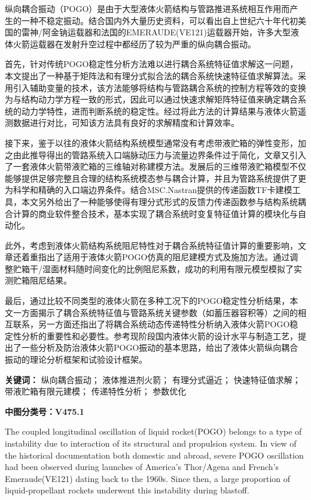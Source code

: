 
纵向耦合振动（POGO）是由于大型液体火箭结构与管路推进系统相互作用而产生的一种不稳定振动。结合国内外大量历史资料，可以看出自上世纪六十年代初美国的雷神/阿金钠运载器和法国的EMERAUDE(VE121)运载器开始，许多大型液体火箭运载器在发射升空过程中都经历了较为严重的纵向耦合振动。

首先，针对传统POGO稳定性分析方法难以进行耦合系统特征值求解这一问题，本文提出了一种基于矩阵法和有理分式拟合法的耦合系统快速特征值求解算法。采用引入辅助变量的技术，该方法能够将结构与管路耦合系统的控制方程等效的变换为与结构动力学方程一致的形式，因此可以通过快速求解矩阵特征值来确定耦合系统的动力学特性，进而判断系统的稳定性。经过将此方法的计算结果与液体火箭遥测数据进行对比，可知该方法具有良好的求解精度和计算效率。

接下来，鉴于以往的液体火箭结构系统模型通常没有考虑带液贮箱的弹性变形，加之由此推导得出的管路系统入口端脉动压力与流量边界条件过于简化，文章又引入了一套液体火箭带液贮箱的三维轴对称建模方法。发展后的三维带液贮箱模型不仅能够提供足够完整且合理的结构系统模态参与耦合计算，并且为管路系统提供了更为科学和精确的入口端边界条件。结合MSC.Nastran提供的传递函数TF卡建模工具，本文另外给出了一种能够使得有理分式形式的反馈力传递函数参与结构系统耦合计算的商业软件整合技术，基本实现了耦合系统时变复特征值计算的模块化与自动化。

此外，考虑到液体火箭结构系统阻尼特性对于耦合系统特征值计算的重要影响，文章还着重指出了适用于液体火箭POGO仿真的阻尼建模方式及施加方法。通过调整贮箱干/湿面材料随时间变化的比例阻尼系数，成功的利用有限元模型模拟了实测贮箱阻尼结果。

最后，通过比较不同类型的液体火箭在多种工况下的POGO稳定性分析结果，本文一方面揭示了耦合系统特征值与管路系统关键参数（如蓄压器容积等）之间的相互联系，另一方面还指出了将耦合系统动态传递特性分析纳入液体火箭POGO稳定性分析的重要性和必要性。参考现阶段国内液体火箭的设计水平与制造工艺，提出了一些分析及防治液体火箭POGO振动的基本思路，给出了液体火箭纵向耦合振动的理论分析框架和试验设计框架。

\bigskip
\noindent \textbf{关键词：\hspace{\Han}}
纵向耦合振动；\;
液体推进剂火箭；\;
有理分式逼近；\;
快速特征值求解；\;
带液贮箱有限元建模；\;
传递特性分析；\;
参数优化

\bigskip
\noindent \textbf{中图分类号：\hspace{\Han}V475.1}

The coupled longitudinal oscillation of liquid rocket(POGO) belongs to a type of instability due to interaction of its structural and propulsion system. In view of the historical documentation both domestic and abroad, severe POGO oscillation had been observed during launches of America's Thor/Agena and French's Emeraude(VE121) dating back to the 1960s. Since then, a large proportion of liquid-propellant rockets underwent this instability during blastoff.

